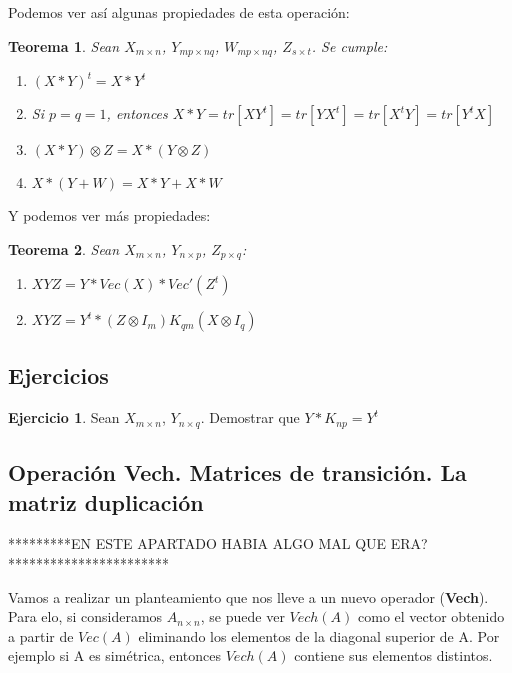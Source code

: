 \documentclass{article}
\theoremstyle{theorem-style}  %
\newtheorem{theorem}{Teorema}[section]  %
\theoremstyle{definition}
\theoremstyle{example-style}
\newtheorem{exercise}{Ejercicio}[section]
\begin{document}
	Podemos ver así algunas propiedades de esta operación:
	
	\begin{theorem}
		Sean $X_{m \times n}$, $Y_{mp \times nq}$, $W_{mp \times nq}$, $Z_{s \times t}$. Se cumple:
		\begin{enumerate}
			
			\item $(X*Y)^t=X*Y^t$
			
			\item Si $p=q=1$, entonces $X*Y =tr[XY^t]=tr[YX^t]=tr[X^tY]=tr[Y^tX]$
			
			\item $(X*Y) \otimes Z = X * (Y \otimes Z)$
			
			\item $X * (Y+W) = X*Y + X*W$
			
		\end{enumerate}	
	\end{theorem}
	
	Y podemos ver más propiedades:
	
	\begin{theorem}
		Sean $X_{m \times n}$, $Y_{n \times p}$, $Z_{p \times q}$:
		
		\begin{enumerate}
			\item $XYZ= Y*Vec(X)*Vec'(Z^t)$
			
			\item $ XYZ = Y^t * (Z \otimes I_m)K_{qm}(X \otimes I_q)$ 
		\end{enumerate}
	\end{theorem}
	
	\subsection*{Ejercicios}
	\begin{exercise}
		Sean $X_{m \times n}$, $Y_{n \times q}$. Demostrar que $Y*K_{np}=Y^t$
	\end{exercise}

\subsection{Operación Vech. Matrices de transición. La matriz duplicación}

*********EN ESTE APARTADO HABIA ALGO MAL QUE ERA? ***********************

Vamos a realizar un planteamiento que nos lleve a un nuevo operador (\textbf{Vech}). Para elo, si consideramos $A_{n \times n}$, se puede ver $Vech(A)$ como el vector obtenido a partir de $Vec(A)$ eliminando los elementos de la diagonal superior de A. Por ejemplo si A es simétrica, entonces $Vech(A)$ contiene sus elementos distintos. \\
\end{document}
